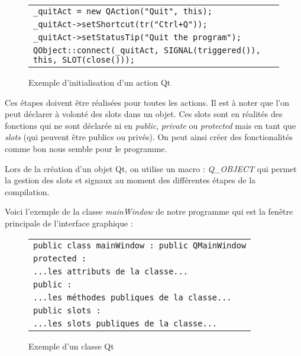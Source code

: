 \begin{figure}[H]
   \begin{center}
      \begin{tabular}{l}
         \hline
         \verb|_quitAct = new QAction("Quit", this);|\\
         \verb|_quitAct->setShortcut(tr("Ctrl+Q"));|\\
         \verb|_quitAct->setStatusTip("Quit the program");|\\
         \verb|QObject::connect(_quitAct, SIGNAL(triggered()), this, SLOT(close()));|\\
         \hline
      \end{tabular}
   \end{center}
\caption{\label{exemple_initAction_qt} Exemple d'initialisation d'un action Qt}
\end{figure}

Ces \'etapes doivent \^etre r\'ealis\'ees pour toutes les actions. Il est \`a noter que l'on peut d\'eclarer \`a volont\'e des slots dans un objet. Ces slots sont en r\'ealit\'es des fonctions qui ne sont d\'eclar\'ee ni en \textit{public}, \textit{private} ou \textit{protected} mais en tant que \textit{slots} (qui peuvent \^etre publics ou priv\'es). On peut ainsi cr\'eer des fonctionalit\'es comme bon nous semble pour le programme.

\par
Lors de la cr\'eation d'un objet Qt, on utilise un macro : \textit{Q\_OBJECT} qui permet la gestion des slots et signaux au moment des diff\'erentes \'etapes de la compilation.

\par
Voici l'exemple de la classe \textit{mainWindow} de notre programme qui est la fen\^etre  principale de l'interface graphique :

\begin{figure}[H]
   \begin{center}
      \begin{tabular}{l}
         \hline
         \verb|public class mainWindow : public QMainWindow|\\
         \verb|protected :|\\
         \verb|...les attributs de la classe...|\\
         \verb|public :|\\
         \verb|...les méthodes publiques de la classe...|\\
         \verb|public slots :|\\
         \verb|...les slots publiques de la classe...|\\
         \hline
      \end{tabular}
   \end{center}
\caption{\label{exemple_mainWindow_qt} Exemple d'un classe Qt}
\end{figure}

